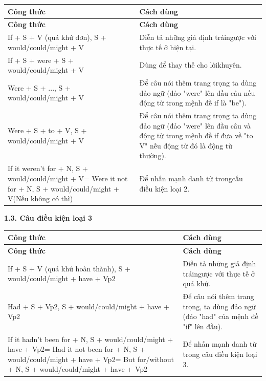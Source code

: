 \documentclass[12pt,a4paper,twoside]{article}
\begin{document}
{\small
\renewcommand{\arraystretch}{1.25}
\begin{longtable}{|>{\raggedright\arraybackslash}p{}|>{\raggedright\arraybackslash}p{}|}
\hline
\rowcolor{pastelBlue}
\textbf{Công thức} & \textbf{Cách dùng} \\
\hline
\endfirsthead
\hline
\rowcolor{pastelBlue}
\textbf{Công thức} & \textbf{Cách dùng} \\
\hline
\endhead
\endfoot
\endlastfoot
If + S + V (quá khứ đơn), S + would/could/might + V & Diễn tả những giả định trái\newline ngược với thực tế ở hiện tại. \\
\hline
If + S + were + S + would/could/might + V & Dùng để thay thế cho lời\newline khuyên. \\
\hline
Were + S + ..., S + would/could/might + V & Để câu nói thêm trang trọng ta dùng đảo ngữ (đảo "were" lên đầu câu nếu động từ trong mệnh đề if là "be"). \\
\hline
Were + S + to + V, S + would/could/might + V & Để câu nói thêm trang trọng ta dùng đảo ngữ (đảo "were" lên đầu câu và động từ trong mệnh đề if đưa về "to V" nếu động từ đó là động từ thường). \\
\hline
If it weren't for + N, S + would/could/might + V\newline = Were it not for + N, S + would/could/might + V\newline (Nếu không có thì) & Để nhấn mạnh danh từ trong\newline cấu điều kiện loại 2. \\
\hline
\end{longtable}
}
\par\noindent\textbf{\large 1.3. Câu điều kiện loại 3}\par\vspace{2pt}
{\small
\renewcommand{\arraystretch}{1.25}
\begin{longtable}{|>{\raggedright\arraybackslash}p{}|>{\raggedright\arraybackslash}p{}|}
\hline
\rowcolor{pastelBlue}
\textbf{Công thức} & \textbf{Cách dùng} \\
\hline
\endfirsthead
\hline
\rowcolor{pastelBlue}
\textbf{Công thức} & \textbf{Cách dùng} \\
\hline
\endhead
\endfoot
\endlastfoot
If + S + V (quá khứ hoàn thành), S + would/could/might + have + Vp2 & Diễn tả những giả định trái\newline ngược với thực tế ở quá khứ. \\
\hline
Had + S + Vp2, S + would/could/might + have + Vp2 & Để câu nói thêm trang trọng, ta dùng đảo ngữ (đảo "had" của mệnh đề "if" lên đầu). \\
\hline
If it hadn't been for + N, S + would/could/might + have + Vp2\newline = Had it not been for + N, S + would/could/might + have + Vp2\newline = But for/without + N, S + would/could/might + have + Vp2 & Để nhấn mạnh danh từ trong câu điều kiện loại 3. \\
\hline
\end{longtable}
}
\end{document}
